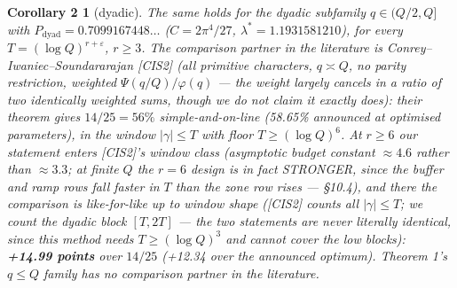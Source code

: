 \documentclass[11pt]{amsart}
\theoremstyle{plain}
\newtheorem*{corollarytwo}{Corollary 2}
\theoremstyle{remark}
\begin{document}
\begin{corollarytwo}[dyadic]
The same holds for the dyadic subfamily $q \in (Q/2, Q]$ with
{\boldmath$P_{\mathrm{dyad}} = 0.7099167448\dots$} ($C = 2\pi^4/27$,
$\lambda^* = 1.1931581210$), for every $T = (\log Q)^{r+\varepsilon}$, $r \ge 3$. The
comparison partner in the literature is Conrey--Iwaniec--Soundararajan [CIS2] (all
primitive characters, $q \asymp Q$, no parity restriction, weighted $\Psi(q/Q)/\varphi(q)$
--- the weight largely cancels in a ratio of two identically weighted sums, though we do
not claim it exactly does): their theorem gives $14/25 = 56\%$ simple-and-on-line
(58.65\% announced at optimised parameters), in the window $|\gamma| \le T$ with floor
$T \ge (\log Q)^{6}$. At $r \ge 6$ our statement enters [CIS2]'s window class
(asymptotic budget constant $\approx 4.6$ rather than $\approx 3.3$; at finite $Q$ the
$r = 6$ design is in fact STRONGER, since the buffer and ramp rows fall faster in $T$
than the zone row rises --- \S10.4), and there the comparison is like-for-like up to
window shape ([CIS2] counts all $|\gamma| \le T$; we count the dyadic block $[T, 2T]$
--- the two statements are never literally identical, since this method needs
$T \ge (\log Q)^{3}$ and cannot cover the low blocks): \textbf{+14.99 points} over
$14/25$ (+12.34 over the announced optimum). Theorem 1's $q \le Q$ family has no
comparison partner in the literature.
\end{corollarytwo}
\end{document}
